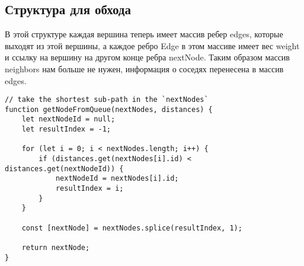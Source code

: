 \documentclass[../article.tex]{subfiles}
\begin{document}
\subsection{Структура для обхода}

В этой структуре каждая вершина теперь имеет массив ребер {\firacodebold edges}, которые выходят из этой вершины, а каждое ребро {\firacodebold Edge} в этом массиве имеет вес {\firacodebold weight} и ссылку на вершину на другом конце ребра {\firacodebold nextNode}. Таким образом массив {\firacodebold neighbors} нам больше не нужен, информация о соседях перенесена в массив {\firacodebold edges}.

\begin{figure*}
    \begin{ruledelement}
        \begin{lstlisting}[caption={Отличие алгоритма дейкстры}, label={lst:dijkstraDiffBfs}]
// take the shortest sub-path in the `nextNodes`
function getNodeFromQueue(nextNodes, distances) {
    let nextNodeId = null;
    let resultIndex = -1;

    for (let i = 0; i < nextNodes.length; i++) {
        if (distances.get(nextNodes[i].id) < distances.get(nextNodeId)) {
            nextNodeId = nextNodes[i].id;
            resultIndex = i;
        }
    }

    const [nextNode] = nextNodes.splice(resultIndex, 1);

    return nextNode;
}
        \end{lstlisting}
    \end{ruledelement}
\end{figure*}
\end{document}
